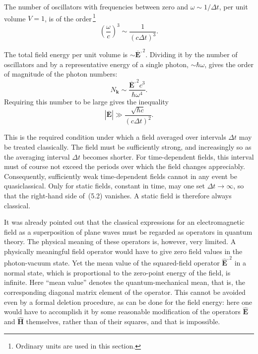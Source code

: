 The number of oscillators with frequencies between zero and $\omega \sim 1/\Delta t$, per unit volume $V = 1$, is of the order\,\footnote{Ordinary units are used in this section.}
\begin{equation}
\left(\frac{\omega}{c}\right)^3 \sim \frac{1}{(c\Delta t)^3}.
\tag{5.1}
\end{equation}

The total field energy per unit volume is $\sim \overline{\mathbf E}^{,2}$. Dividing it by the number of oscillators and by a representative energy of a single photon, $\sim \hbar\omega$, gives the order of magnitude of the photon numbers:
\[
N_{\mathbf{k}} \sim \frac{\overline{\mathbf E}^{,2}c^3}{\hbar\omega^4}.
\]
Requiring this number to be large gives the inequality
\begin{equation}
|\overline{\mathbf E}| \gg \frac{\sqrt{\hbar c}}{(c\Delta t)^2}.
\tag{5.2}
\end{equation}

This is the required condition under which a field averaged over intervals $\Delta t$ may be treated classically. The field must be sufficiently strong, and increasingly so as the averaging interval $\Delta t$ becomes shorter. For time-dependent fields, this interval must of course not exceed the periods over which the field changes appreciably. Consequently, sufficiently weak time-dependent fields cannot in any event be quasiclassical. Only for static fields, constant in time, may one set $\Delta t \to \infty$, so that the right-hand side of~(5.2) vanishes. A static field is therefore always classical.

It was already pointed out that the classical expressions for an electromagnetic field as a superposition of plane waves must be regarded as operators in quantum theory. The physical meaning of these operators is, however, very limited. A physically meaningful field operator would have to give zero field values in the photon-vacuum state. Yet the mean value of the squared-field operator $\widehat{\mathbf E}^{,2}$ in a normal state, which is proportional to the zero-point energy of the field, is infinite. Here ``mean value'' denotes the quantum-mechanical mean, that is, the corresponding diagonal matrix element of the operator. This cannot be avoided even by a formal deletion procedure, as can be done for the field energy: here one would have to accomplish it by some reasonable modification of the operators $\widehat{\mathbf E}$ and $\widehat{\mathbf H}$ themselves, rather than of their squares, and that is impossible.
